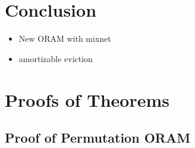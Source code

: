 \documentclass[conference]{IEEEtran}
\begin{document}
\section{Conclusion}
\begin{itemize}
 \item New ORAM with mixnet
 \item amortizable eviction
\end{itemize}


{}


\appendix 
\section{Proofs of Theorems}

\subsection{Proof of Permutation ORAM}
\end{document}
